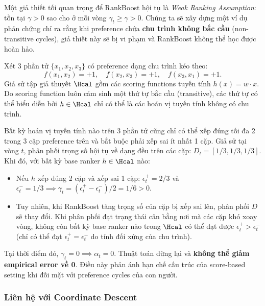 \begin{tcolorbox}[colback=extensioncolor, colframe=yellow!60!black, title={\textbf{[MỞ RỘNG] Phản ví dụ: Sự sụp đổ của Weak Ranking Assumption với Preference Cycle}}]
Một giả thiết tối quan trọng để RankBoost hội tụ là \textit{Weak Ranking Assumption}: tồn tại $\gamma > 0$ sao cho ở mỗi vòng $\gamma_t \geq \gamma > 0$. Chúng ta sẽ xây dựng một ví dụ phản chứng chỉ ra rằng khi preference chứa \textbf{chu trình không bắc cầu} (non-transitive cycles), giả thiết này sẽ bị vi phạm và RankBoost không thể học được hoàn hảo.

Xét 3 phần tử $\{x_1, x_2, x_3\}$ có preference dạng chu trình kéo theo:
\[
    f(x_1, x_2) = +1, \quad f(x_2, x_3) = +1, \quad f(x_3, x_1) = +1.
\]
Giả sử tập giả thuyết $\Hcal$ gồm các scoring functions tuyến tính $h(x) = w \cdot x$. Do scoring function luôn cảm sinh một thứ tự bắc cầu (transitive), các thứ tự có thể biểu diễn bởi $h \in \Hcal$ chỉ có thể là các hoán vị tuyến tính không có chu trình. 

Bất kỳ hoán vị tuyến tính nào trên 3 phần tử cũng chỉ có thể xếp đúng tối đa 2 trong 3 cặp preference trên và bắt buộc phải xếp sai ít nhất 1 cặp.
Giả sử tại vòng $t$, phân phối trọng số hội tụ về dạng đều trên các cặp: $D_t = [1/3, 1/3, 1/3]$. Khi đó, với bất kỳ base ranker $h \in \Hcal$ nào:
\begin{itemize}
    \item Nếu $h$ xếp đúng 2 cặp và xếp sai 1 cặp: $\epsilon^+_t = 2/3$ và $\epsilon^-_t = 1/3 \implies \gamma_t = (\epsilon^+_t - \epsilon^-_t)/2 = 1/6 > 0$.
    \item Tuy nhiên, khi RankBoost tăng trọng số của cặp bị xếp sai lên, phân phối $D$ sẽ thay đổi. Khi phân phối đạt trạng thái cân bằng nơi mà các cặp khó xoay vòng, không còn bất kỳ base ranker nào trong $\Hcal$ có thể đạt được $\epsilon^+_t > \epsilon^-_t$ (chỉ có thể đạt $\epsilon^+_t = \epsilon^-_t$ do tính đối xứng của chu trình).
\end{itemize}
Tại thời điểm đó, $\gamma_t = 0 \implies \alpha_t = 0$. Thuật toán dừng lại và \textbf{không thể giảm empirical error về 0}. Điều này phản ánh hạn chế cấu trúc của score-based setting khi đối mặt với preference cycles của con người.
\end{tcolorbox}

\subsubsection{Liên hệ với Coordinate Descent}

